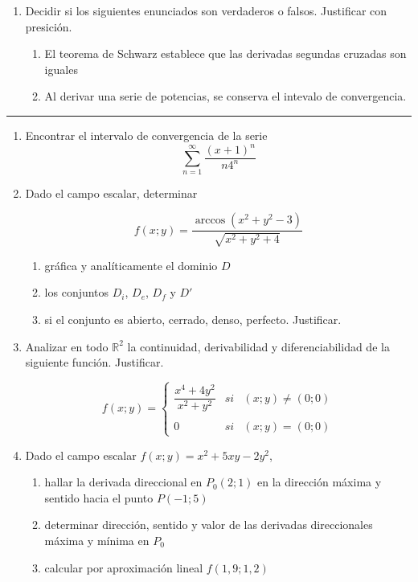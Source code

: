 \documentclass[9pt,a4paper]{extarticle}
\begin{document}
\begin{enumerate}
    \item Decidir si los siguientes enunciados son verdaderos o falsos. Justificar con presición.
    \begin{enumerate}
         \item El teorema de Schwarz establece que las derivadas segundas cruzadas son iguales
         \item Al derivar una serie de potencias, se conserva el intevalo de convergencia.
    \end{enumerate}
\end{enumerate}

\hrule
{}

\begin{enumerate}
    \item Encontrar el intervalo de convergencia de la serie
    \[
    \sum^\infty_{n=1} \dfrac{{(x+1)}^n}{n4^n}
    \]
    
    
    \item Dado el campo escalar, determinar
    
    \[
    f(x;y)= \dfrac{\arccos(x^2+y^2-3)}{\sqrt{x^2+y^2+4}}
    \]
    
    \begin{enumerate}
        \item gráfica y analíticamente el dominio $D$
        \item los conjuntos $D_i$, $D_e$, $D_f$ y $D'$
        \item si el conjunto es abierto, cerrado, denso, perfecto. Justificar.
    \end{enumerate}
    
    
    \item Analizar en todo ${\mathbb{R}}^2$ la continuidad, derivabilidad y diferenciabilidad de la siguiente función. Justificar.
    
    \[
    f(x;y)= \left\{ \begin{array}{lcc}
             \dfrac{x^4 + 4y^2}{x^2 + y^2} &   si  & (x;y) \neq (0;0) \\
             \\ 0 &  si & (x;y) = (0;0)
             \end{array}
   \right.
    \]
    
    \item Dado el campo escalar $f(x;y)=x^2+5xy-2y^2$, 
    \begin{enumerate}
        \item hallar la derivada direccional en $P_0 (2;1)$ en la dirección máxima y sentido hacia el punto $P (-1;5)$
        \item determinar dirección, sentido y valor de las derivadas direccionales máxima y mínima en $P_0$
        \item calcular por aproximación lineal $f(1,9;1,2)$
    \end{enumerate}
    

\end{enumerate}
\end{document}
